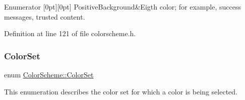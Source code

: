 \begin{DoxyEnumFields}{Enumerator}
[0pt][0pt]{}\mbox{\label{class_color_scheme_a70715e73df1fb0f140797633f8043a8ca3925f3061468258acbca115ca6384f3f}} 
Positive\+Background&Eigth color; for example, success messages, trusted content. \\
\hline

\end{DoxyEnumFields}


Definition at line 121 of file colorscheme.\+h.

\mbox{\label{class_color_scheme_a56ea451e86dffa1822ed087902844e05}} 
\subsubsection{\texorpdfstring{Color\+Set}{ColorSet}}
{\footnotesize\ttfamily enum \hyperlink{class_color_scheme_a56ea451e86dffa1822ed087902844e05}{Color\+Scheme\+::\+Color\+Set}}

This enumeration describes the color set for which a color is being selected.

